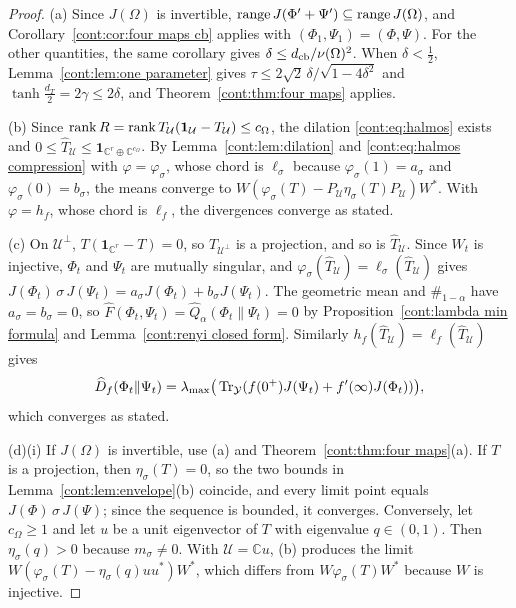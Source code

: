 \begin{proof}
(a) Since $J(\Omega)$ is invertible, $\operatorname{range} J(\Phi'+\Psi')\subseteq\operatorname{range} J(\Omega)$, and Corollary~\ref{cont:cor:four maps cb} applies with $(\Phi_1,\Psi_1)=(\Phi,\Psi)$. For the other quantities, the same corollary gives $\delta\leq d_{\rm cb}/\nu(\Omega)^2$. When $\delta<\frac12$, Lemma~\ref{cont:lem:one parameter} gives $\tau\leq2\sqrt2\,\delta/\sqrt{1-4\delta^2}$ and $\tanh\frac{d_T}{2}=2\gamma\leq2\delta$, and Theorem~\ref{cont:thm:four maps} applies.

(b) Since $\operatorname{rank} R=\operatorname{rank} T_{\mathcal{U}}(\mathbf{1}_{\mathcal{U}}-T_{\mathcal{U}})\leq c_\Omega$, the dilation \eqref{cont:eq:halmos} exists and $0\leq\widehat T_{\mathcal{U}}\leq\mathbf{1}_{\mathbb{C}^r\oplus\mathbb{C}^{c_\Omega}}$. By Lemma~\ref{cont:lem:dilation} and \eqref{cont:eq:halmos compression} with $\varphi=\varphi_\sigma$, whose chord is $\ell_\sigma$ because $\varphi_\sigma(1)=a_\sigma$ and $\varphi_\sigma(0)=b_\sigma$, the means converge to $W(\varphi_\sigma(T)-P_{\mathcal{U}}\eta_\sigma(T)P_{\mathcal{U}})W^*$. With $\varphi=h_f$, whose chord is $\ell_f$, the divergences converge as stated.

(c) On $\mathcal{U}^\perp$, $T(\mathbf{1}_{\mathbb{C}^r}-T)=0$, so $T_{\mathcal{U}^\perp}$ is a projection, and so is $\widehat T_{\mathcal{U}}$. Since $W_t$ is injective, $\Phi_t$ and $\Psi_t$ are mutually singular, and $\varphi_\sigma(\widehat T_{\mathcal{U}})=\ell_\sigma(\widehat T_{\mathcal{U}})$ gives $J(\Phi_t)\,\sigma\,J(\Psi_t)=a_\sigma J(\Phi_t)+b_\sigma J(\Psi_t)$. The geometric mean and $\#_{1-\alpha}$ have $a_\sigma=b_\sigma=0$, so $\widehat F(\Phi_t,\Psi_t)=\widehat Q_\alpha(\Phi_t\|\Psi_t)=0$ by Proposition~\ref{cont:lambda min formula} and Lemma~\ref{cont:renyi closed form}. Similarly $h_f(\widehat T_{\mathcal{U}})=\ell_f(\widehat T_{\mathcal{U}})$ gives
\[
\widehat D_f(\Phi_t\|\Psi_t)=\lambda_{\max}\big(\operatorname{Tr}_{\mathcal{Y}}(f(0^+)J(\Psi_t)+f'(\infty)J(\Phi_t))\big),
\]
which converges as stated.

(d)(i) If $J(\Omega)$ is invertible, use (a) and Theorem~\ref{cont:thm:four maps}(a). If $T$ is a projection, then $\eta_\sigma(T)=0$, so the two bounds in Lemma~\ref{cont:lem:envelope}(b) coincide, and every limit point equals $J(\Phi)\,\sigma\,J(\Psi)$; since the sequence is bounded, it converges. Conversely, let $c_\Omega\geq1$ and let $u$ be a unit eigenvector of $T$ with eigenvalue $q\in(0,1)$. Then $\eta_\sigma(q)>0$ because $m_\sigma\neq0$. With $\mathcal{U}=\mathbb{C}u$, (b) produces the limit $W(\varphi_\sigma(T)-\eta_\sigma(q)uu^*)W^*$, which differs from $W\varphi_\sigma(T)W^*$ because $W$ is injective.


\end{proof}
